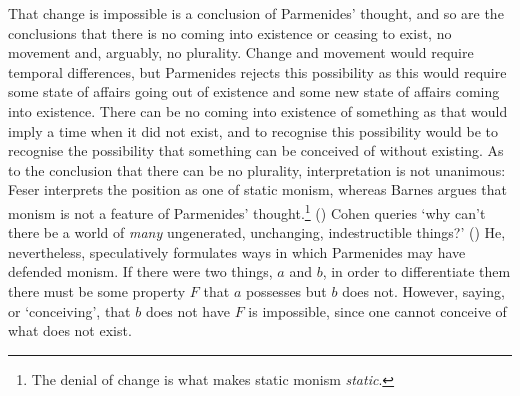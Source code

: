 That change is impossible is a conclusion of Parmenides' thought, and so are the conclusions that there is no coming into existence or ceasing to exist, no movement and, arguably, no plurality. Change and movement would require temporal differences, but Parmenides rejects this possibility as this would require some state of affairs going out of existence and some new state of affairs coming into existence. There can be no coming into existence of something as that would imply a time when it did not exist, and to recognise this possibility would be to recognise the possibility that something can be conceived of without existing. As to the conclusion that there can be no plurality, interpretation is not unanimous: Feser interprets the position as one of static monism, whereas Barnes argues that monism is not a feature of Parmenides' thought.\footnote{The denial of change is what makes static monism \emph{static}.} (\citeyear[][163--64]{barnes2002presocratic}) Cohen queries `why can't there be a world of \emph{many} ungenerated, unchanging, indestructible things?' (\citeyear[][]{cohen-parm1}) He, nevertheless, speculatively formulates ways in which Parmenides may have defended monism. If there were two things, $a$ and $b$, in order to differentiate them there must be some property $F$ that $a$ possesses but $b$ does not. However, saying, or `conceiving', that $b$ does not have $F$ is impossible, since one cannot conceive of what does not exist.

